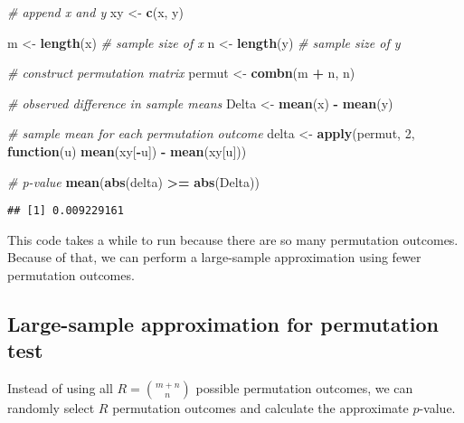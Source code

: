 \documentclass[
]{book}
\newenvironment{Shaded}{\begin{snugshade}}{\end{snugshade}}
\newcommand{\CommentTok}[1]{\textcolor[rgb]{0.56,0.35,0.01}{\textit{#1}}}
\newcommand{\ControlFlowTok}[1]{\textcolor[rgb]{0.13,0.29,0.53}{\textbf{#1}}}
\newcommand{\DecValTok}[1]{\textcolor[rgb]{0.00,0.00,0.81}{#1}}
\newcommand{\KeywordTok}[1]{\textcolor[rgb]{0.13,0.29,0.53}{\textbf{#1}}}
\newcommand{\NormalTok}[1]{#1}
\newcommand{\OperatorTok}[1]{\textcolor[rgb]{0.81,0.36,0.00}{\textbf{#1}}}
\newcommand{\StringTok}[1]{\textcolor[rgb]{0.31,0.60,0.02}{#1}}
\begin{document}
\begin{Shaded}
\begin{Highlighting}[]
\CommentTok{# append x and y}
\NormalTok{xy <-}\StringTok{ }\KeywordTok{c}\NormalTok{(x, y)}

\NormalTok{m <-}\StringTok{ }\KeywordTok{length}\NormalTok{(x) }\CommentTok{# sample size of x}
\NormalTok{n <-}\StringTok{ }\KeywordTok{length}\NormalTok{(y) }\CommentTok{# sample size of y}

\CommentTok{# construct permutation matrix}
\NormalTok{permut <-}\StringTok{ }\KeywordTok{combn}\NormalTok{(m }\OperatorTok{+}\StringTok{ }\NormalTok{n, n)}

\CommentTok{# observed difference in sample means}
\NormalTok{Delta <-}\StringTok{ }\KeywordTok{mean}\NormalTok{(x) }\OperatorTok{-}\StringTok{ }\KeywordTok{mean}\NormalTok{(y)}

\CommentTok{# sample mean for each permutation outcome}
\NormalTok{delta <-}\StringTok{ }\KeywordTok{apply}\NormalTok{(permut, }\DecValTok{2}\NormalTok{,}
               \ControlFlowTok{function}\NormalTok{(u) }\KeywordTok{mean}\NormalTok{(xy[}\OperatorTok{-}\NormalTok{u]) }\OperatorTok{-}\StringTok{ }\KeywordTok{mean}\NormalTok{(xy[u]))}

\CommentTok{# p-value}
\KeywordTok{mean}\NormalTok{(}\KeywordTok{abs}\NormalTok{(delta) }\OperatorTok{>=}\StringTok{ }\KeywordTok{abs}\NormalTok{(Delta))}
\end{Highlighting}
\end{Shaded}

\begin{verbatim}
## [1] 0.009229161
\end{verbatim}

This code takes a while to run because there are so many permutation outcomes.
Because of that, we can perform a large-sample approximation using fewer permutation outcomes.

\hypertarget{large-sample-approximation-for-permutation-test-1}{%
\subsection{Large-sample approximation for permutation test}\label{large-sample-approximation-for-permutation-test-1}}

Instead of using all \(R = {{m + n} \choose {n}}\) possible permutation outcomes,
we can randomly select \(R\) permutation outcomes and calculate the approximate
\(p\)-value.
\end{document}
